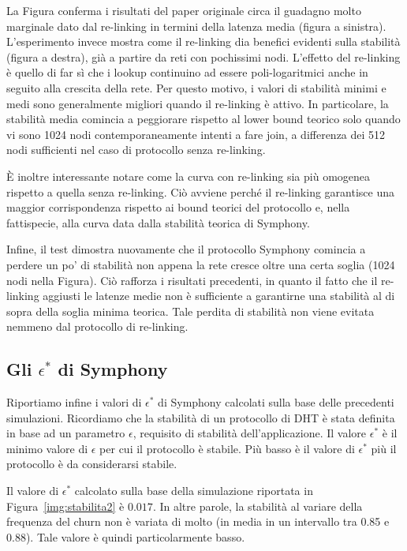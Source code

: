 \documentclass[prodmode,acmtap]{acmlarge}
\begin{document}
La Figura conferma i risultati del paper originale circa il guadagno molto marginale dato dal re-linking in termini della latenza media (figura a sinistra). L'esperimento invece  mostra come il re-linking dia benefici evidenti sulla stabilità (figura a destra), già a partire da reti con pochissimi nodi. L'effetto del re-linking è quello di far sì che i lookup continuino ad essere poli-logaritmici anche in seguito alla crescita della rete. Per questo motivo, i valori di stabilità minimi e medi sono generalmente migliori quando il re-linking è attivo. In particolare, la stabilità media comincia a peggiorare rispetto al lower bound teorico solo quando vi sono 1024 nodi contemporaneamente intenti a fare join, a differenza dei 512 nodi sufficienti nel caso di protocollo senza re-linking.

È inoltre interessante notare come la curva con re-linking sia più omogenea rispetto a quella senza re-linking. Ciò avviene perché il re-linking garantisce una maggior corrispondenza rispetto ai bound teorici del protocollo e, nella fattispecie, alla curva data dalla stabilità teorica di Symphony.

Infine, il test dimostra nuovamente che il protocollo Symphony comincia a perdere un po' di stabilità non appena la rete cresce oltre una certa soglia (1024 nodi nella Figura). Ciò rafforza i risultati precedenti, in quanto il fatto che il re-linking aggiusti le latenze medie non è sufficiente a garantirne una stabilità al di sopra della soglia minima teorica. Tale perdita di stabilità non viene evitata nemmeno dal protocollo di re-linking.



\subsection{Gli $\epsilon^*$ di Symphony}
Riportiamo infine i valori di $\epsilon^*$ di Symphony calcolati sulla base delle precedenti simulazioni. Ricordiamo che la stabilità di un protocollo di DHT è stata definita in base ad un parametro $\epsilon$, requisito di stabilità dell'applicazione. Il valore $\epsilon^*$ è il minimo valore di $\epsilon$ per cui il protocollo è stabile. Più basso è il valore di $\epsilon^*$ più il protocollo è da considerarsi stabile.

Il valore di $\epsilon^*$ calcolato sulla base della simulazione riportata in Figura~\ref{img:stabilita2} è $0.017$. In altre parole, la stabilità al variare della frequenza del churn non è variata di molto (in media in un intervallo tra 0.85 e 0.88). Tale valore è quindi particolarmente basso.
\end{document}
